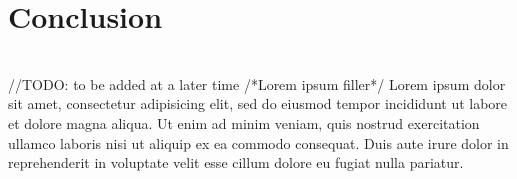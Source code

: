 \documentclass{article}
\begin{document}
\section{Conclusion}
\\
//TODO: to be added at a later time /*Lorem ipsum filler*/
Lorem ipsum dolor sit amet, consectetur adipisicing elit, sed do eiusmod tempor
incididunt ut labore et dolore magna aliqua. Ut enim ad minim veniam, quis
nostrud exercitation ullamco laboris nisi ut aliquip ex ea commodo consequat.
Duis aute irure dolor in reprehenderit in voluptate velit esse cillum dolore eu
fugiat nulla pariatur.
\\
\end{document}
